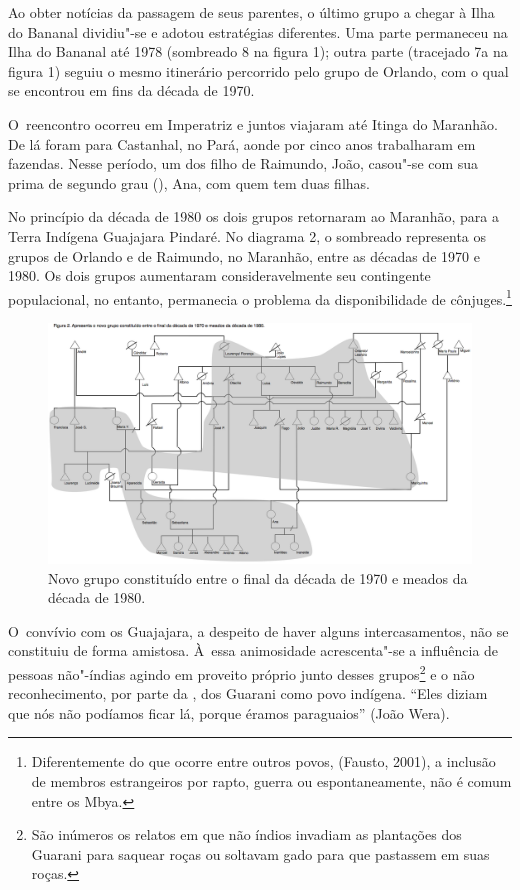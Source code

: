 Ao obter notícias da passagem de seus parentes, o último grupo a chegar
à Ilha do Bananal dividiu"-se e adotou estratégias diferentes. Uma parte
permaneceu na Ilha do Bananal até 1978 (sombreado 8 na figura 1); outra
parte (tracejado 7a na figura 1) seguiu o mesmo itinerário percorrido
pelo grupo de Orlando, com o qual se encontrou em fins da década de
1970.

O~reencontro ocorreu em Imperatriz e juntos viajaram até Itinga do
Maranhão. De lá foram para Castanhal, no Pará, aonde por cinco anos
trabalharam em fazendas. Nesse período, um dos filho de Raimundo, João,
casou"-se com sua prima de segundo grau (), Ana, com quem tem duas
filhas.

No princípio da década de 1980 os dois grupos retornaram ao Maranhão,
para a Terra Indígena Guajajara Pindaré. No diagrama 2, o sombreado
representa os grupos de Orlando e de Raimundo, no Maranhão, entre as
décadas de 1970 e 1980. Os dois grupos aumentaram consideravelmente seu
contingente populacional, no entanto, permanecia o problema da
disponibilidade de cônjuges.\footnote{Diferentemente do que ocorre
entre outros povos, (Fausto, 2001), a inclusão de membros estrangeiros
por rapto, guerra ou espontaneamente, não é comum entre os Mbya.}

\begin{figure}
  \centering
 \includegraphics[width=\textwidth]{./img/GUARANIS-img10.png}	
  \hfill
  \caption{Novo grupo constituído entre o final da década de 1970 e meados da década de 1980.}
\end{figure}
 
 

O~convívio com os Guajajara, a despeito de haver alguns intercasamentos,
não se constituiu de forma amistosa. À~essa animosidade acrescenta"-se a
influência de pessoas não"-índias agindo em proveito próprio junto
desses grupos\footnote{São inúmeros os relatos em que não índios
invadiam as plantações dos Guarani para saquear roças ou soltavam gado
para que pastassem em suas roças.} e o não reconhecimento, por parte da
, dos Guarani como povo indígena. ``Eles diziam que nós não
podíamos ficar lá, porque éramos paraguaios'' (João Wera). 

